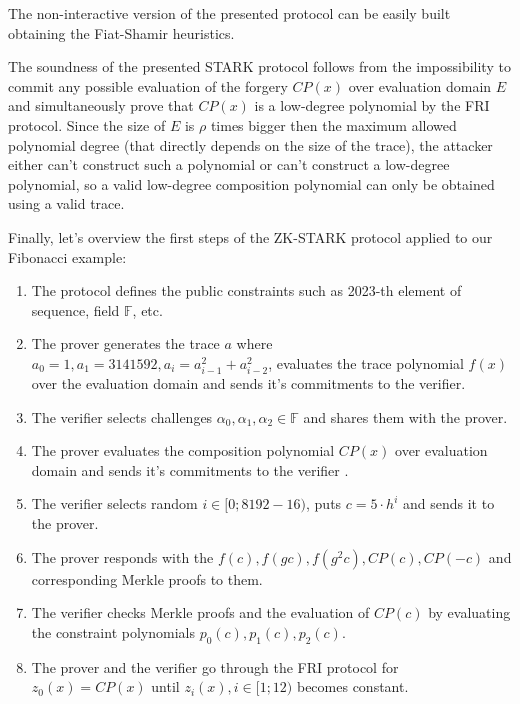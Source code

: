 \documentclass[../lecture-notes.tex]{subfiles}
\begin{document}
The non-interactive version of the presented protocol can be easily built obtaining the Fiat-Shamir heuristics.

The soundness of the presented STARK protocol follows from the impossibility to commit any possible evaluation of the forgery $CP(x)$ over evaluation domain $E$ and simultaneously prove that $CP(x)$ is a low-degree polynomial by the FRI protocol. 
Since the size of $E$ is $\rho$ times bigger then the maximum allowed polynomial degree (that directly depends on the size of the trace), the attacker either can't construct such a polynomial or can't construct a low-degree polynomial, so a valid low-degree composition polynomial can only be obtained using a valid trace.

\begin{example}
    Finally, let's overview the first steps of the ZK-STARK protocol applied to our Fibonacci example:
    
    \begin{enumerate}
        \item The protocol defines the public constraints such as 2023-th element of sequence, field $\mathbb{F}$, etc.
        \item The prover generates the trace $a$ where $a_0 = 1, a_1 = 3141592, a_i = a_{i-1}^2 + a_{i-2}^2$, 
        evaluates the trace polynomial $f(x)$ over the evaluation domain and sends it's commitments to the verifier. 
        \item The verifier selects challenges $\alpha_0, \alpha_1, \alpha_2 \in \mathbb{F}$ and shares them with the prover.
        \item The prover evaluates the composition polynomial $CP(x)$ over evaluation domain and sends it's commitments to the verifier .
        \item The verifier selects random $i \in [0; 8192-16)$, puts $c = 5\cdot h^i$ and sends it to the prover.
        \item The prover responds with the $f(c), f(gc), f(g^2c), CP(c), CP(-c)$ and corresponding Merkle proofs to them.
        \item The verifier checks Merkle proofs and the evaluation of $CP(c)$ by evaluating the constraint polynomials $p_0(c), p_1(c), p_2(c)$.
        \item The prover and the verifier go through the FRI protocol for $z_0(x) = CP(x)$ until $z_i(x), i \in [1;12)$ becomes constant.
    \end{enumerate}
    
\end{example}
\end{document}
